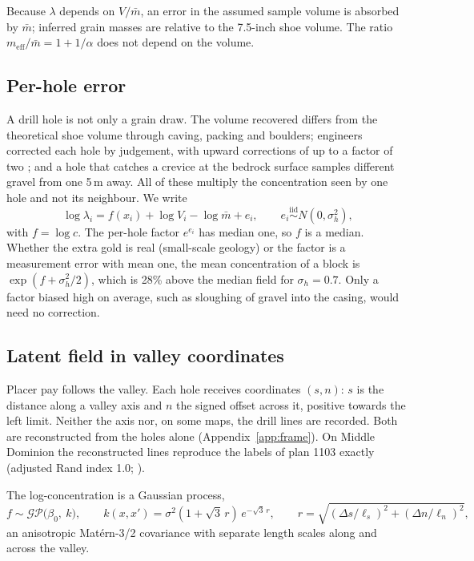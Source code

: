 \documentclass[11pt,a4paper]{article}
\theoremstyle{remark}
\newcommand{\meff}{m_{\mathrm{eff}}}
\newcommand{\mbar}{\bar m}
\begin{document}
Because $\lambda$ depends on $V/\mbar$, an error in the assumed sample volume is absorbed by $\mbar$; inferred grain masses are relative to the 7.5-inch shoe volume. The ratio $\meff/\mbar = 1 + 1/\alpha$ does not depend on the volume.

\subsection{Per-hole error}

A drill hole is not only a grain draw. The volume recovered differs from the theoretical shoe volume through caving, packing and boulders; engineers corrected each hole by judgement, with upward corrections of up to a factor of two \citep{Wells1969}; and a hole that catches a crevice at the bedrock surface samples different gravel from one 5\,m away. All of these multiply the concentration seen by one hole and not its neighbour. We write
\begin{equation}\label{eq:perhole}
\log\lambda_i = f(x_i) + \log V_i - \log\mbar + e_i,\qquad e_i \overset{\mathrm{iid}}{\sim} N(0, \sigma_h^2),
\end{equation}
with $f = \log c$. The per-hole factor $e^{e_i}$ has median one, so $f$ is a median. Whether the extra gold is real (small-scale geology) or the factor is a measurement error with mean one, the mean concentration of a block is $\exp(f + \sigma_h^2/2)$, which is 28\% above the median field for $\sigma_h = 0.7$. Only a factor biased high on average, such as sloughing of gravel into the casing, would need no correction.

\subsection{Latent field in valley coordinates}

Placer pay follows the valley. Each hole receives coordinates $(s, n)$: $s$ is the distance along a valley axis and $n$ the signed offset across it, positive towards the left limit. Neither the axis nor, on some maps, the drill lines are recorded. Both are reconstructed from the holes alone (Appendix~\ref{app:frame}). On Middle Dominion the reconstructed lines reproduce the labels of plan 1103 exactly (adjusted Rand index 1.0; \citealp{Hubert1985}).

The log-concentration is a Gaussian process,
\begin{equation}\label{eq:gp}
f \sim \mathcal{GP}\big(\beta_0,\ k\big),\qquad
k(x, x') = \sigma^2 (1 + \sqrt{3}\,r)\,e^{-\sqrt{3}\,r},\qquad
r = \sqrt{(\Delta s/\ell_s)^2 + (\Delta n/\ell_n)^2},
\end{equation}
an anisotropic Mat\'ern-3/2 covariance \citep{Stein1999} with separate length scales along and across the valley. 
\end{document}
